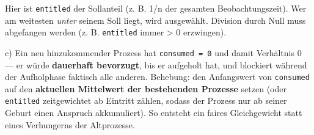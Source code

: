 \documentclass[11pt, a4paper]{article}
\begin{document}
Hier ist \texttt{entitled} der Sollanteil (z. B. 1/n der gesamten Beobachtungszeit). Wer am weitesten \textit{unter} seinem Soll liegt, wird ausgewählt. Division durch Null muss abgefangen werden (z. B. \texttt{entitled} immer > 0 erzwingen).


c) Ein neu hinzukommender Prozess hat \texttt{consumed = 0} und damit Verhältnis 0 — er würde \textbf{dauerhaft bevorzugt}, bis er aufgeholt hat, und blockiert während der Aufholphase faktisch alle anderen. Behebung: den Anfangswert von \texttt{consumed} auf den \textbf{aktuellen Mittelwert der bestehenden Prozesse} setzen (oder \texttt{entitled} zeitgewichtet ab Eintritt zählen, sodass der Prozess nur ab seiner Geburt einen Anspruch akkumuliert). So entsteht ein faires Gleichgewicht statt eines Verhungerns der Altprozesse.





\end{document}
